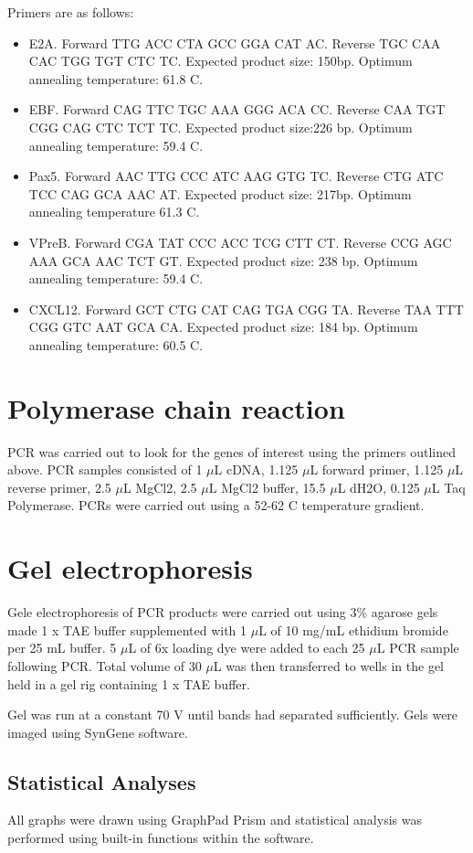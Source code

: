 Primers are as follows:
\begin{itemize}
\item E2A. Forward TTG ACC CTA GCC GGA CAT AC.
Reverse TGC CAA CAC TGG TGT CTC TC.
Expected product size: 150bp.
Optimum annealing temperature: 61.8 \textdegree C.

\item EBF.
Forward CAG TTC TGC AAA GGG ACA CC.
Reverse CAA TGT CGG CAG CTC TCT TC.
Expected product size:226 bp.
Optimum annealing temperature: 59.4 \textdegree C.

\item Pax5. Forward AAC TTG CCC ATC AAG GTG TC.
Reverse CTG ATC TCC CAG GCA AAC AT.
Expected product size: 217bp.
Optimum annealing temperature 61.3 \textdegree C.

\item VPreB.
Forward CGA TAT CCC ACC TCG CTT CT.
Reverse CCG AGC AAA GCA AAC TCT GT.
Expected product size: 238 bp.
Optimum annealing temperature: 59.4 \textdegree C.

\item CXCL12.
Forward GCT CTG CAT CAG TGA CGG TA.
Reverse TAA TTT CGG GTC AAT GCA CA.
Expected product size: 184 bp.
Optimum annealing temperature: 60.5 \textdegree C.
\end{itemize}

\section{Polymerase chain reaction}

PCR was carried out to look for the genes of interest using the primers outlined above.
PCR samples consisted of 1 $\mu$L cDNA, 1.125 $\mu$L forward primer, 1.125 $\mu$L reverse primer, 2.5 $\mu$L MgCl{2}, 2.5 $\mu$L MgCl{2} buffer, 15.5 $\mu$L dH{2}O, 0.125 $\mu$L Taq Polymerase.
PCRs were carried out using a 52-62 \textdegree C temperature gradient.

\section{Gel electrophoresis}

Gele electrophoresis of PCR products were carried out using 3\% agarose gels made 1 x TAE buffer supplemented with 1 $\mu$L of 10 mg/mL ethidium bromide per 25 mL buffer.
5 $\mu$L of 6x loading dye were added to each 25 $\mu$L PCR sample following PCR.
Total volume of 30 $\mu$L was then transferred to wells in the gel held in a gel rig containing 1 x TAE buffer.

Gel was run at a constant 70 V until bands had separated sufficiently.
Gels were imaged using SynGene software.




\subsection{Statistical Analyses}

All graphs were drawn using GraphPad Prism and statistical analysis was performed using built-in functions within the software.
